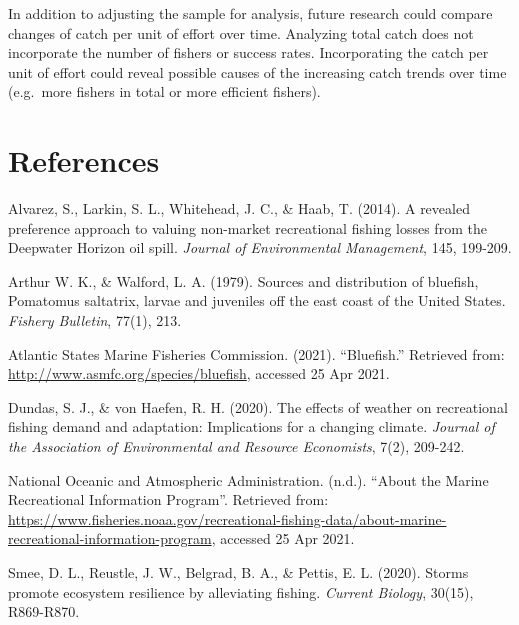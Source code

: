 \documentclass[
  12pt,
]{article}
\begin{document}
In addition to adjusting the sample for analysis, future research could
compare changes of catch per unit of effort over time. Analyzing total
catch does not incorporate the number of fishers or success rates.
Incorporating the catch per unit of effort could reveal possible causes
of the increasing catch trends over time (e.g.~more fishers in total or
more efficient fishers).

\newpage

\hypertarget{references}{%
\section{References}\label{references}}

Alvarez, S., Larkin, S. L., Whitehead, J. C., \& Haab, T. (2014). A
revealed preference approach to valuing non-market recreational fishing
losses from the Deepwater Horizon oil spill. \emph{Journal of
Environmental Management}, 145, 199-209.

Arthur W. K., \& Walford, L. A. (1979). Sources and distribution of
bluefish, Pomatomus saltatrix, larvae and juveniles off the east coast
of the United States. \emph{Fishery Bulletin}, 77(1), 213.

Atlantic States Marine Fisheries Commission. (2021). ``Bluefish.''
Retrieved from: \url{http://www.asmfc.org/species/bluefish}, accessed 25
Apr 2021.

Dundas, S. J., \& von Haefen, R. H. (2020). The effects of weather on
recreational fishing demand and adaptation: Implications for a changing
climate. \emph{Journal of the Association of Environmental and Resource
Economists}, 7(2), 209-242.

National Oceanic and Atmospheric Administration. (n.d.). ``About the
Marine Recreational Information Program''. Retrieved from:
\url{https://www.fisheries.noaa.gov/recreational-fishing-data/about-marine-recreational-information-program},
accessed 25 Apr 2021.

Smee, D. L., Reustle, J. W., Belgrad, B. A., \& Pettis, E. L. (2020).
Storms promote ecosystem resilience by alleviating fishing.
\emph{Current Biology}, 30(15), R869-R870.
\end{document}
